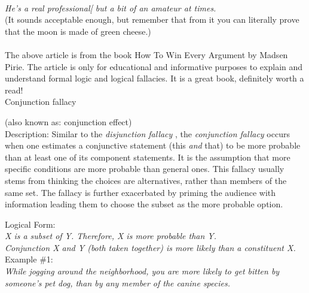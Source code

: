 \documentclass[a4paper,12pt,single,pdftex]{scrartcl}
\begin{document}
      
         
      \\

      
        {\em He’s a real professional[ but a bit of an amateur at times.}
      \\

      
        (It sounds acceptable enough, but remember that from it you can literally prove that the moon is made of green cheese.)
      \\

      
         
      \\

      
        The above article is from the book How To Win Every Argument by Madsen Pirie. The article is only for educational and informative purposes to explain and understand formal logic and logical fallacies. It is a great book, definitely worth a read!
      \\

    
  

Conjunction fallacy
    
      (also known as: conjunction effect)
    \\

  
    Description: Similar to the {\it disjunction fallacy} , the {\em conjunction fallacy} occurs when one estimates a conjunctive statement (this {\em and}  that) to be more probable than at least one of its component statements. It is the assumption that more specific conditions are more probable than general ones.  This fallacy usually stems from thinking the choices are alternatives, rather than members of the same set.  The fallacy is further exacerbated by priming the audience with information leading them to choose the subset as the more probable option.

    
      Logical Form:
    \\

    
      {\em X is a subset of Y. \newline
Therefore, X is more probable than Y.}
    \\

    
      {\em Conjunction X and Y (both taken together) is more likely than a constituent X.}
    \\

    
      Example \#1:
    \\

    
      {\em While jogging around the neighborhood, you are more likely to get bitten by someone’s pet dog, than by any member of the canine species.}
    \\
\end{document}
